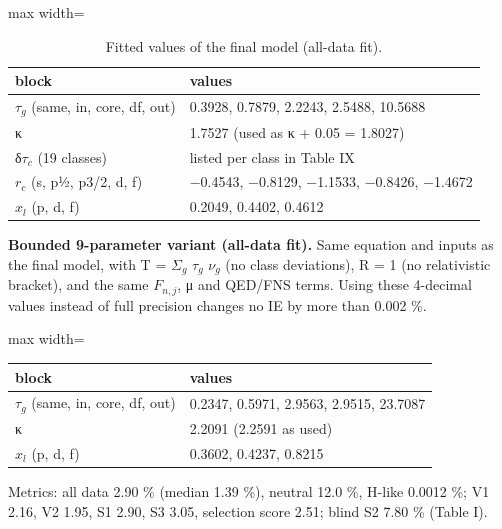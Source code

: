 \documentclass[aps,pra,preprint,notitlepage,superscriptaddress,amsmath,amssymb]{revtex4-2}
\begin{document}
\begin{table}[htbp]
\caption{Fitted values of the final model (all-data fit).}
\footnotesize\linespread{1}\selectfont\setlength{\tabcolsep}{5pt}\renewcommand{\arraystretch}{1.1}
\begin{adjustbox}{max width=\linewidth}
\begin{tabular}{ll}
\hline\hline
block & values \\
\hline
$τ_{g}$ (same, in, core, df, out) & 0.3928, 0.7879, 2.2243, 2.5488, 10.5688 \\
κ & 1.7527 (used as \textbar{}κ\textbar{} + 0.05 = 1.8027) \\
δ$τ_{c}$ (19 classes) & listed per class in Table IX \\
$r_{c}$ (s, p½, p3/2, d, f) & −0.4543, −0.8129, −1.1533, −0.8426, −1.4672 \\
$x_{l}$ (p, d, f) & 0.2049, 0.4402, 0.4612 \\
\hline\hline
\end{tabular}
\end{adjustbox}
\end{table}


\textbf{Bounded 9-parameter variant (all-data fit).} Same equation and inputs as the final model, with T = $Σ_{g}$ $τ_{g}$ $ν_{g}$ (no class deviations), R = 1 (no relativistic bracket), and the same $F_{n,j}$, μ and QED/FNS terms. Using these 4-decimal values instead of full precision changes no IE by more than 0.002 \%.


\begin{table}[h]
\footnotesize\linespread{1}\selectfont\setlength{\tabcolsep}{5pt}\renewcommand{\arraystretch}{1.1}
\begin{adjustbox}{max width=\linewidth}
\begin{tabular}{ll}
\hline\hline
block & values \\
\hline
$τ_{g}$ (same, in, core, df, out) & 0.2347, 0.5971, 2.9563, 2.9515, 23.7087 \\
κ & 2.2091 (2.2591 as used) \\
$x_{l}$ (p, d, f) & 0.3602, 0.4237, 0.8215 \\
\hline\hline
\end{tabular}
\end{adjustbox}
\end{table}


Metrics: all data 2.90 \% (median 1.39 \%), neutral 12.0 \%, H-like 0.0012 \%; V1 2.16, V2 1.95, S1 2.90, S3 3.05, selection score 2.51; blind S2 7.80 \% (Table I).
\end{document}

